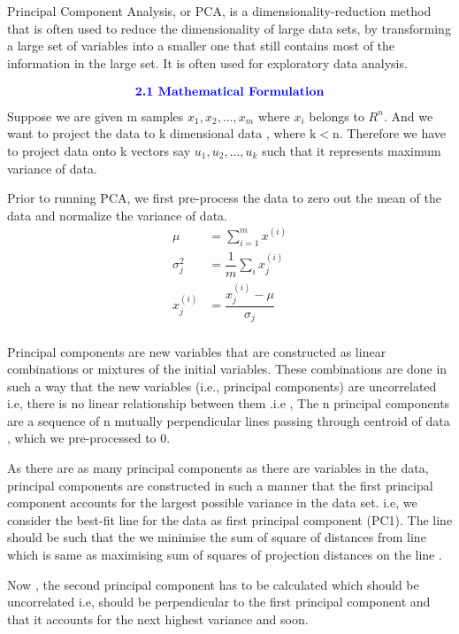 \documentclass[12pt,a4paper]{article}
\begin{document}
{\section{}
Principal Component Analysis, or PCA, is a dimensionality-reduction method that is often used to reduce the dimensionality of large data sets, by transforming a large set of variables into a smaller one that still contains most of the information in the large set. It is
often used for exploratory data analysis.

\begin{align*}
    \textcolor{blue}{\text{{\textbf{2.1 Mathematical Formulation}}}}
\end{align*}
Suppose we are given m samples $x_1, x_2, . . . , x_m$ where $x_i$ belongs to $R^n$. And we want to project the data to k dimensional data , where k$<$n. Therefore we have to project data onto k vectors say $u_1,u_2, . . . , u_k$ such that it represents maximum variance of data.

Prior to running PCA, we first pre-process the data to zero out the mean of the data and normalize the variance of data.
\begin{align*}
    \mu &= \sum^m_{i=1}{x^{(i)}}  \\
    \sigma^2_j &= \dfrac{1}{m} \sum_i x^{(i)}_j \\
    x^{(i)}_j &= \dfrac{x^{(i)}_j - \mu}{\sigma_j} \\
\end{align*}

Principal components are new variables that are constructed as linear combinations or mixtures of the initial variables. These combinations are done in such a way that the new variables (i.e., principal components) are uncorrelated i.e, there is no linear relationship between them .i.e , The n principal components are a sequence of n mutually perpendicular lines passing through centroid of data , which we pre-processed to 0.


As there are as many principal components as there are variables in the data, principal components are constructed in such a manner that the first principal component accounts for the largest possible variance in the data set. i.e, we consider the best-fit line for the data as first principal component (PC1). The line should be such that the we minimise the sum of square of distances from line which is same as maximising sum of squares of projection distances on the line .

Now , the second principal component has to be calculated which should be uncorrelated i.e, should be perpendicular to the first principal component and  that it accounts for the next highest variance and soon.

}
\end{document}
